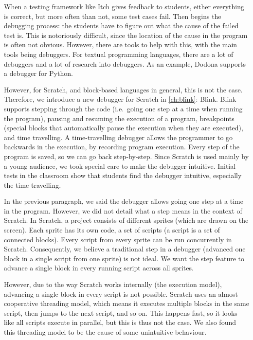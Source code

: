 \documentclass[main]{subfiles}
\begin{document}
When a testing framework like Itch gives feedback to students, either everything is correct, but more often than not, some test cases fail.
Then begins the debugging process: the students have to figure out what the cause of the failed test is.
This is notoriously difficult, since the location of the cause in the program is often not obvious.
However, there are tools to help with this, with the main tools being debuggers.
For textual programming languages, there are a lot of debuggers and a lot of research into debuggers.
As an example, Dodona supports a debugger for Python.

However, for Scratch, and block-based languages in general, this is not the case.
Therefore, we introduce a new debugger for Scratch in \cref{ch:blink}: Blink.
Blink supports stepping through the code (i.e.\ going one step at a time when running the program), pausing and resuming the execution of a program, breakpoints (special blocks that automatically pause the execution when they are executed), and time travelling.
A time-travelling debugger allows the programmer to go backwards in the execution, by recording program execution.
Every step of the program is saved, so we can go back step-by-step.
Since Scratch is used mainly by a young audience, we took special care to make the debugger intuitive.
Initial tests in the classroom show that students find the debugger intuitive, especially the time travelling.

In the previous paragraph, we said the debugger allows going one step at a time in the program.
However, we did not detail what a step means in the context of Scratch.
In Scratch, a project consists of different sprites (which are drawn on the screen).
Each sprite has its own code, a set of scripts (a script is a set of connected blocks).
Every script from every sprite can be run concurrently in Scratch.
Consequently, we believe a traditional step in a debugger (advanced one block in a single script from one sprite) is not ideal.
We want the step feature to advance a single block in every running script across all sprites.

However, due to the way Scratch works internally (the execution model), advancing a single block in every script is not possible.
Scratch uses an almost-cooperative threading model, which means it executes multiple blocks in the same script, then jumps to the next script, and so on.
This happens fast, so it looks like all scripts execute in parallel, but this is thus not the case.
We also found this threading model to be the cause of some unintuitive behaviour.
\end{document}
